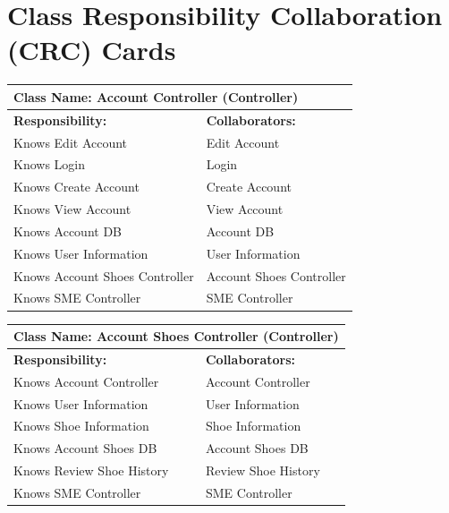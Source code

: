 \documentclass[]{article}
\begin{document}
\section{Class Responsibility Collaboration (CRC) Cards}
\label{sec:class_responsibility_collaboration_crc_cards}
\begin{table}[H]
    \centering
    \begin{tabular}{|p{}|p{}|}
        \hline
        \multicolumn{2}{|l|}{\textbf{Class Name:} Account Controller (Controller)} \\
        \hline
        \textbf{Responsibility:} & \textbf{Collaborators:} \\
        \hline
        Knows Edit Account & Edit Account \\
        Knows Login & Login \\
        Knows Create Account & Create Account\\
        Knows View Account & View Account \\
        Knows Account DB & Account DB \\
        Knows User Information & User Information \\
        Knows Account Shoes Controller & Account Shoes Controller \\
        Knows SME Controller & SME Controller \\
        \hline
    \end{tabular}
    \label{tab:account_controller}
\end{table}

\begin{table}[H]
    \centering
    \begin{tabular}{|p{}|p{}|}
        \hline
        \multicolumn{2}{|l|}{\textbf{Class Name:} Account Shoes Controller (Controller)} \\
        \hline
        \textbf{Responsibility:} & \textbf{Collaborators:} \\
        \hline
        Knows Account Controller & Account Controller \\
        Knows User Information & User Information \\
        Knows Shoe Information & Shoe Information \\
        Knows Account Shoes DB & Account Shoes DB \\
        Knows Review Shoe History & Review Shoe History \\
        Knows SME Controller & SME Controller \\
        \hline
    \end{tabular}
    \label{tab:account_shoes_controller}
\end{table}
\end{document}
